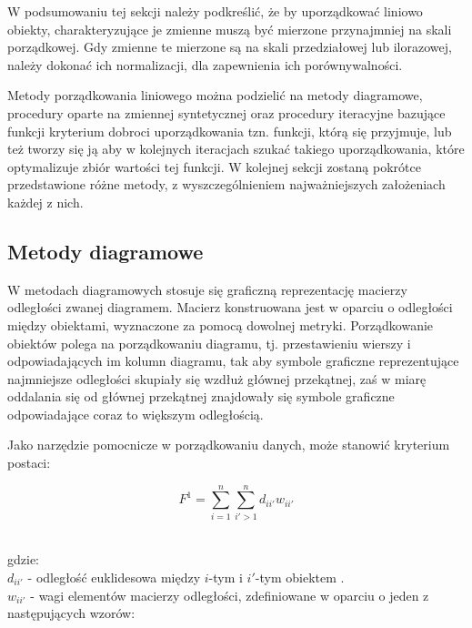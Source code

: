 \documentclass[12pt,a4paper]{report}
\begin{document}
W podsumowaniu tej sekcji należy podkreślić, że by uporządkować liniowo obiekty, charakteryzujące je zmienne muszą być mierzone przynajmniej na skali porządkowej. Gdy zmienne te mierzone są na skali przedziałowej lub ilorazowej, należy dokonać ich normalizacji, dla zapewnienia ich porównywalności.

Metody porządkowania liniowego można podzielić na metody diagramowe, procedury oparte na zmiennej syntetycznej oraz procedury iteracyjne bazujące funkcji kryterium dobroci uporządkowania tzn. funkcji, którą się przyjmuje, lub też tworzy się ją aby w kolejnych iteracjach szukać takiego uporządkowania, które optymalizuje zbiór wartości tej funkcji. W kolejnej sekcji zostaną pokrótce przedstawione różne metody, z wyszczególnieniem najważniejszych założeniach każdej z nich.

\newpage
\subsection{Metody diagramowe}
\noindent

W metodach diagramowych stosuje się graficzną reprezentację macierzy odległości zwanej diagramem. Macierz konstruowana jest w oparciu o odległości między obiektami, wyznaczone za pomocą dowolnej metryki. Porządkowanie obiektów polega na porządkowaniu diagramu, tj. przestawieniu wierszy i odpowiadających im kolumn diagramu, tak aby symbole graficzne reprezentujące najmniejsze odległości skupiały się wzdłuż głównej przekątnej, zaś w miarę oddalania się od głównej przekątnej znajdowały się symbole graficzne odpowiadające coraz to większym odległością.  %


Jako narzędzie pomocnicze w porządkowaniu danych, może stanowić kryterium postaci:

\begin{center}
$$F^1= \sum_{i=1}^{n} \sum_{i'>1}^{n} d_{ii'}w_{ii'}$$\\
\end{center}
gdzie:\\
 $d_{ii'}$ - odległość euklidesowa między $i$-tym i $i'$-tym obiektem . \\
 $w_{ii'}$ - wagi elementów macierzy odległości, zdefiniowane w oparciu o jeden z następujących wzorów: \\
 
\end{document}
